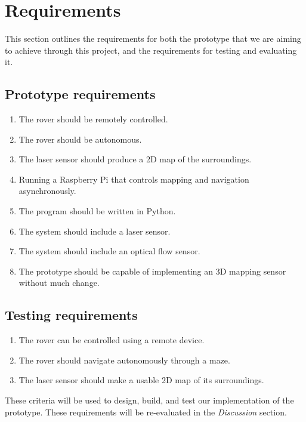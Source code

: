 \section{Requirements}

This section outlines the requirements for both the prototype that we are aiming to achieve through this project, and the requirements for testing and evaluating it.

\subsection{Prototype requirements}

\begin{enumerate}
	
	\item The rover should be remotely controlled.
	\item The rover should be autonomous.
	\item The laser sensor should produce a 2D map of the surroundings.
	\item Running a Raspberry Pi that controls mapping and navigation asynchronously.
	\item The program should be written in Python.
	\item The system should include a laser sensor.
	\item The system should include an optical flow sensor.
 	\item The prototype should be capable of implementing an 3D mapping sensor without much change. %
	
\end{enumerate}

\subsection{Testing requirements}

\begin{enumerate}
	
	\item The rover can be controlled using a remote device.
	\item The rover should navigate autonomously through a maze.
	\item The laser sensor should make a usable 2D map of its surroundings.
	
\end{enumerate}

These criteria will be used to design, build, and test our implementation of the prototype. These requirements will be re-evaluated in the \textit{Discussion} section.
